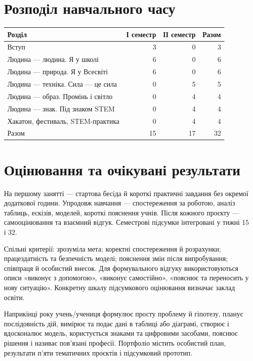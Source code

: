 \documentclass[10pt,a4paper,landscape]{article}
\begin{document}
\section*{Розподіл навчального часу}
\begin{tabular}{P{125mm}rrr}
\toprule Розділ & І семестр & ІІ семестр & Разом \\\midrule
Вступ & 3 & 0 & 3 \\
Людина — людина. Я у школі & 6 & 0 & 6 \\
Людина — природа. Я у Всесвіті & 6 & 0 & 6 \\
Людина — техніка. Сила — це сила & 0 & 5 & 5 \\
Людина — образ. Промінь і світло & 0 & 4 & 4 \\
Людина — знак. Під знаком STEM & 0 & 4 & 4 \\
Хакатон, фестиваль, STEM-практика & 0 & 4 & 4 \\
\midrule Разом & 15 & 17 & 32 \\
\bottomrule\end{tabular}
\section*{Оцінювання та очікувані результати}
На першому занятті — стартова бесіда й короткі практичні завдання без окремої додаткової години. Упродовж навчання — спостереження за роботою, аналіз таблиць, ескізів, моделей, короткі пояснення учнів. Після кожного проєкту — самооцінювання та взаємний відгук. Семестрові підсумки інтегровані у тижні 15 і 32.

Спільні критерії: зрозуміла мета; коректні спостереження й розрахунки; працездатність та безпечність моделі; пояснення змін після випробування; співпраця й особистий внесок. Для формувального відгуку використовуються описи «виконує з допомогою», «виконує самостійно», «пояснює та переносить у нову ситуацію». Конкретну шкалу підсумкового оцінювання визначає заклад освіти.

Наприкінці року учень/учениця формулює просту проблему й гіпотезу, планує послідовність дій, вимірює та подає дані в таблиці або діаграмі, створює і вдосконалює модель, користується знаками та цифровими засобами, пояснює рішення і називає пов’язані професії. Портфоліо містить особистий план, результати п’яти тематичних проєктів і підсумковий прототип.
\newpage
\end{document}
